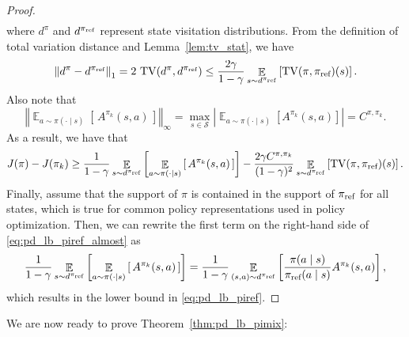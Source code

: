 \documentclass{article}
\begin{document}
\begin{proof}
\begin{multline}
\end{multline}
where $d^{\pi}$ and $d^{\pi_{\textnormal{ref}}}$ represent state visitation distributions. From the definition of total variation distance and Lemma~\ref{lem:tv_stat}, we have
\begin{equation}
\left\Vert d^{\pi} - d^{\pi_{\textnormal{ref}}} \right\Vert_1 = 2 \, \operatorname{TV}(d^\pi,d^{\pi_{\textnormal{ref}}}) \leq \frac{2\gamma}{1-\gamma} \mathop{\mathbb{E}}_{s \sim d^{\pi_{\textnormal{ref}}}} \left[ \operatorname{TV}(\pi,\pi_{\textnormal{ref}})(s) \right].
\end{equation}
Also note that
\begin{equation}
\left\Vert \mathop{\mathbb{E}}_{a \sim \pi(\cdot \mid s)} \left[ \,  A^{\pi_k}(s,a) \, \right] \right\Vert_\infty = \max_{s \in \mathcal{S}} \left| \mathop{\mathbb{E}}_{a \sim \pi(\cdot \mid s)} \left[ A^{\pi_k}(s,a) \right] \right| = C^{\pi,\pi_k}.
\end{equation}
As a result, we have that
\begin{equation}\label{eq:pd_lb_piref_almost}
J(\pi) - J(\pi_k) \geq \frac{1}{1-\gamma} \mathop{\mathbb{E}}_{s \sim d^{\pi_{\textnormal{ref}}}} \left[ \mathop{\mathbb{E}}_{a \sim \pi(\cdot \mid s)} \left[ \,  A^{\pi_k}(s,a) \, \right] \right] - \frac{2\gamma C^{\pi,\pi_k}}{(1-\gamma)^2} \mathop{\mathbb{E}}_{s \sim d^{\pi_{\textnormal{ref}}}} \left[ \operatorname{TV}(\pi,\pi_{\textnormal{ref}})(s) \right].
\end{equation}
Finally, assume that the support of $\pi$ is contained in the support of $\pi_{\textnormal{ref}}$ for all states, which is true for common policy representations used in policy optimization. Then, we can rewrite the first term on the right-hand side of \eqref{eq:pd_lb_piref_almost} as
\begin{equation}
\frac{1}{1-\gamma} \mathop{\mathbb{E}}_{s \sim d^{\pi_{\textnormal{ref}}}} \left[ \mathop{\mathbb{E}}_{a \sim \pi(\cdot \mid s)} \left[ \,  A^{\pi_k}(s,a) \, \right] \right] = \frac{1}{1-\gamma} \mathop{\mathbb{E}}_{(s,a) \sim d^{\pi_{\textnormal{ref}}}} \left[ \frac{\pi(a \mid s)}{\pi_{\textnormal{ref}}(a \mid s)} A^{\pi_k}(s,a) \right],
\end{equation}
which results in the lower bound in \eqref{eq:pd_lb_piref}.
\end{proof}

We are now ready to prove Theorem~\ref{thm:pd_lb_pimix}:
\end{document}

